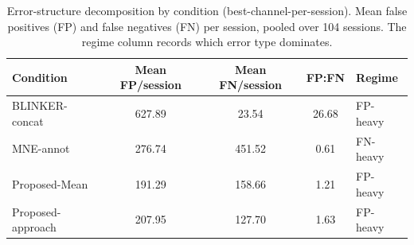\begin{table}[ht]
  \centering
  \caption{Error-structure decomposition by condition (best-channel-per-session). Mean false positives (FP) and false negatives (FN) per session, pooled over 104 sessions. The regime column records which error type dominates.}
  \label{tab:error-structure}
  \begin{tabular}{lcccl}
    \toprule
    Condition & Mean FP/session & Mean FN/session & FP:FN & Regime \\
    \midrule
    BLINKER-concat & 627.89 & 23.54 & 26.68 & FP-heavy \\
    MNE-annot & 276.74 & 451.52 & 0.61 & FN-heavy \\
    Proposed-Mean & 191.29 & 158.66 & 1.21 & FP-heavy \\
    Proposed-approach & 207.95 & 127.70 & 1.63 & FP-heavy \\
    \bottomrule
  \end{tabular}
\end{table}
